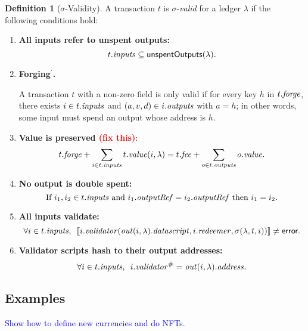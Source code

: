 \documentclass[a4paper]{article}
\newcommand{\red}[1]{\textcolor{red}{#1}}
\newcommand{\blue}[1]{\textcolor{blue}{#1}}
\theoremstyle{definition}  %
\newtheorem{definition}{Definition}
\begin{document}
\begin{definition}[$\sigma$-Validity]\label{def:validity-2} A transaction $t$ is $\sigma$-\emph{valid} for a ledger $\lambda$ if the following conditions hold:
  \begin{enumerate}
    \item \label{all-inputs-refer-to-unspent-outputs-2} \textbf{All
      inputs refer to unspent outputs:}
      \[
        t.\mathit{inputs} \subseteq \mathsf{unspentOutputs}(\lambda).
      \]
    \item\label{forging-2} \textbf{Forging$^{\prime}$.}
      \begin{center}
        \parbox{0.8\textwidth}{
          A transaction $t$ with a non-zero \forge{} field is only valid if for
          every key $h$ in $t.\mathit{forge}$, there exists $i \in t.\mathit{inputs}$
          and $(a,v,d) \in i.\mathit{outputs}$ with $a =h$; in other words, some input
          must spend an output whose address is $h$.
          }
      
      \end{center}
    \item \label{value-is-preserved-2} \textbf{Value is preserved \red{(fix this)}}:
    \[
      t.\mathit{forge} + \sum_{i \in t.\mathit{inputs}} t.\mathit{value}(i, \lambda) = t.\mathit{fee} + \sum_{o \in t.\mathit{outputs}} o.\mathit{value}.
    \]
    \item \label{no-double-spending-2} \textbf{No output is double spent:}
    \[
     \textrm{If } i_1, i_2 \in t.\mathit{inputs} \textrm{ and }  i_1.\mathit{outputRef} = i_2.\mathit{outputRef}
     \textrm{ then } i_1 = i_2.
    \]
    \item\label{all-inputs-validate-2} \textbf{All inputs validate:}
    \[
    \forall i \in t.\mathit{inputs},\enspace \llbracket
    i.\mathit{validator}(\mathit{out}(i,
    \lambda).\mathit{datascript},i.\mathit{redeemer}, \sigma(\lambda, t, i))
    \rrbracket \ne \textsf{error}.
      \]
    \item\label{validator-scripts-hash-2} \textbf{Validator scripts hash to their output addresses:}
    \[
      \forall i \in t.\mathit{inputs},\enspace i.\mathit{validator}^{\#} = \mathit{out}(i, \lambda).\mathit{address}.
    \]
  \end{enumerate}
\end{definition}


\subsection{Examples}
\blue{Show how to define new currencies and do NFTs.}
\end{document}
